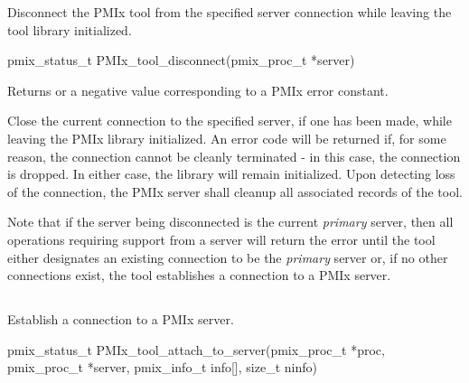 Disconnect the \ac{PMIx} tool from the specified server connection while leaving the tool library initialized.

\format

\cspecificstart
\begin{codepar}
pmix_status_t
PMIx_tool_disconnect(pmix_proc_t *server)
\end{codepar}
\cspecificend

\begin{arglist}
\end{arglist}

Returns  or a negative value corresponding to a PMIx error constant.

\descr

Close the current connection to the specified server, if one has been made, while leaving the \ac{PMIx} library initialized. An error code will be returned if, for some reason, the connection cannot be cleanly terminated - in this case, the connection is dropped. In either case, the library will remain initialized.  Upon
detecting loss of the connection, the \ac{PMIx} server shall cleanup all
associated records of the tool.


Note that if the server being disconnected is the current \emph{primary} server, then all operations requiring support from a server will return the  error until the tool either designates an existing connection to be the \emph{primary} server or, if no other connections exist, the tool establishes a connection to a \ac{PMIx} server.


\subsection{}

\summary

Establish a connection to a \ac{PMIx} server.

\format

\cspecificstart
\begin{codepar}
pmix_status_t
PMIx_tool_attach_to_server(pmix_proc_t *proc, pmix_proc_t *server,
                           pmix_info_t info[], size_t ninfo)
\end{codepar}
\cspecificend

\begin{arglist}
\end{arglist}


